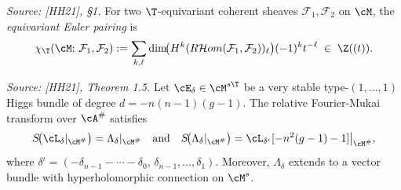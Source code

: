 \begin{definition}
  \label{def:equivariant_euler_pairing}
  \textit{Source: [HH21], §1.}
  For two \(\T\)-equivariant coherent sheaves \(\mathcal{F}_1, \mathcal{F}_2\) on \(\cM\), the
  \emph{equivariant Euler pairing} is
  \[
    \chi_{\T}(\cM;\, \mathcal{F}_1, \mathcal{F}_2)
    := \sum_{k,\ell} \dim\!\bigl(H^k(R\mathcal{H}om(\mathcal{F}_1, \mathcal{F}_2))_\ell\bigr)
       (-1)^k t^{-\ell}
    \;\in\; \Z((t)).
  \]
\end{definition}

\begin{theorem}
  \label{thm:fourier_mukai_mirror}
  \textit{Source: [HH21], Theorem 1.5.}
  Let \(\cE_\delta \in \cM^{s\T}\) be a very stable type-\((1,\ldots,1)\) Higgs bundle of degree
  \(d = -n(n-1)(g-1)\).  The relative Fourier-Mukai transform over \(\cA^{\#}\) satisfies
  \[
    S\!\bigl(\cL_\delta|_{\cM^{\#}}\bigr) = \Lambda_\delta|_{\cM^{\#}}
    \quad \text{and} \quad
    S\!\bigl(\Lambda_\delta|_{\cM^{\#}}\bigr)
      = \cL_{\delta^{\iota}}[-n^2(g-1)-1]\big|_{\cM^{\#}},
  \]
  where \(\delta^{\iota} = (-\delta_{n-1} - \cdots - \delta_0,\, \delta_{n-1}, \ldots, \delta_1)\).
  Moreover, \(\Lambda_\delta\) extends to a vector bundle with hyperholomorphic connection on
  \(\cM^s\).
\end{theorem}

